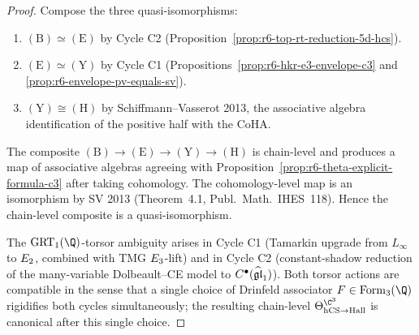 \begin{proof}
Compose the three quasi-isomorphisms:
\begin{enumerate}
\item $(\mathrm B)\simeq(\mathrm E)$ by Cycle C2
(Proposition~\ref{prop:r6-top-rt-reduction-5d-hcs}).
\item $(\mathrm E)\simeq(\mathrm Y)$ by Cycle C1
(Propositions~\ref{prop:r6-hkr-e3-envelope-c3} and
\ref{prop:r6-envelope-pv-equals-sv}).
\item $(\mathrm Y)\cong(\mathrm H)$ by Schiffmann--Vasserot 2013,
the associative algebra identification of the positive half with
the CoHA.
\end{enumerate}
The composite $(\mathrm B)\to(\mathrm E)\to(\mathrm Y)\to(\mathrm H)$
is chain-level and produces a map of associative algebras
agreeing with Proposition~\ref{prop:r6-theta-explicit-formula-c3} after
taking cohomology. The cohomology-level map is an isomorphism by SV
2013 (Theorem~4.1, Publ.~Math.~IHES~118). Hence the chain-level
composite is a quasi-isomorphism.

The $\GRT_1(\Q)$-torsor ambiguity arises in Cycle C1 (Tamarkin upgrade
from $L_\infty$ to $E_2$, combined with TMG $E_3$-lift) and in
Cycle C2 (constant-shadow reduction of the many-variable Dolbeault--CE
model to $C^\bullet(\widehat{\mathfrak{gl}}_1)$). Both torsor actions are compatible in
the sense that a single choice of Drinfeld associator $F\in\mathrm{Form}_3(\Q)$
rigidifies both cycles simultaneously; the resulting chain-level
$\Theta^{\C^3}_{\hCS\to\Hall}$ is canonical after this single choice.
\end{proof}

